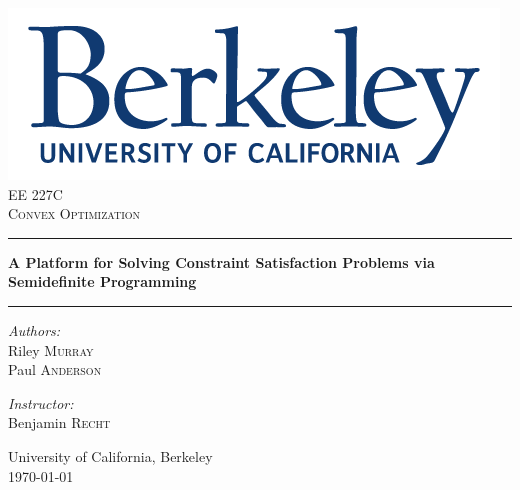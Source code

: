 \documentclass[11pt]{article} %
\begin{document}
\begin{titlepage}
	
	\begin{center}
		\vspace{10cm}
		
		\includegraphics[width=.5\textwidth]{./images/primarylogo}\\[3cm]    
		
		\normalsize EE 227C\\
		\textsc{\large Convex Optimization}\\[1cm]		
		
		\hrule 
		\vspace{1 cm}
		{ \Large \textbf{A Platform for Solving Constraint Satisfaction Problems via Semidefinite Programming}\\[0.5cm]
			\vspace{0.5 cm}
			\hrule
			\vspace{1.5 cm}
			
			\begin{minipage}[t]{0.4\textwidth}
				\begin{flushleft} \large
					\emph{Authors:}\\
					\vspace{0.7ex}
					Riley \textsc{Murray} \\
					Paul \textsc{Anderson}
					
				\end{flushleft}
			\end{minipage}
			\begin{minipage}[t]{0.4\textwidth}
				\begin{flushright} \large
					\emph{Instructor:} \\
					\vspace{0.7ex}
					Benjamin \textsc{Recht}\\[0.3 cm]
				\end{flushright}
			\end{minipage}
			\vfill 
			University of California, Berkeley\\[.5cm]
			\large \today}
		
	\end{center}
	
\end{titlepage}
\end{document}
